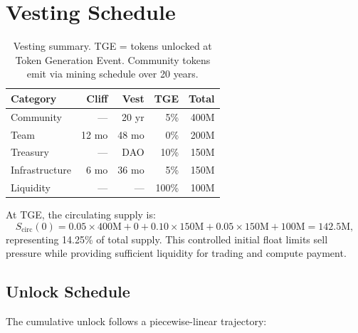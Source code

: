 \documentclass[11pt]{article}
\begin{document}
\section{Vesting Schedule}
\label{sec:vesting}

\begin{table}[H]
\centering
\small
\begin{tabular}{lrrrr}
\toprule
\textbf{Category} & \textbf{Cliff} & \textbf{Vest} & \textbf{TGE} & \textbf{Total} \\
\midrule
Community & --- & 20 yr & 5\% & 400M \\
Team & 12 mo & 48 mo & 0\% & 200M \\
Treasury & --- & DAO & 10\% & 150M \\
Infrastructure & 6 mo & 36 mo & 5\% & 150M \\
Liquidity & --- & --- & 100\% & 100M \\
\bottomrule
\end{tabular}
\caption{Vesting summary. TGE = tokens unlocked at Token Generation Event. Community tokens emit via mining schedule over 20 years.}
\label{tab:vesting}
\end{table}

At TGE, the circulating supply is:
\begin{equation}
S_{\text{circ}}(0) = 0.05 \times 400\text{M} + 0 + 0.10 \times 150\text{M} +
0.05 \times 150\text{M} + 100\text{M} = 142.5\text{M},
\end{equation}
representing 14.25\% of total supply. This controlled initial float limits sell
pressure while providing sufficient liquidity for trading and compute payment.

\subsection{Unlock Schedule}

The cumulative unlock follows a piecewise-linear trajectory:

\begin{center}
\end{center}
\end{document}

